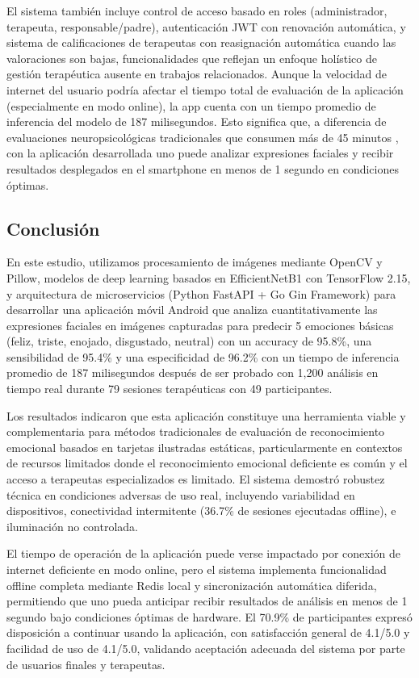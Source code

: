 \documentclass[journal,article,submit,pdftex,moreauthors]{Definitions/mdpi}
\begin{document}
	El sistema también incluye control de acceso basado en roles (administrador, terapeuta, responsable/padre), autenticación JWT con renovación automática, y sistema de calificaciones de terapeutas con reasignación automática cuando las valoraciones son bajas, funcionalidades que reflejan un enfoque holístico de gestión terapéutica ausente en trabajos relacionados. Aunque la velocidad de internet del usuario podría afectar el tiempo total de evaluación de la aplicación (especialmente en modo online), la app cuenta con un tiempo promedio de inferencia del modelo de 187 milisegundos. Esto significa que, a diferencia de evaluaciones neuropsicológicas tradicionales que consumen más de 45 minutos \cite{ref24,ref26}, con la aplicación desarrollada uno puede analizar expresiones faciales y recibir resultados desplegados en el smartphone en menos de 1 segundo en condiciones óptimas.
	
	\subsection{Conclusión}
	
	En este estudio, utilizamos procesamiento de imágenes mediante OpenCV y Pillow, modelos de deep learning basados en EfficientNetB1 con TensorFlow 2.15, y arquitectura de microservicios (Python FastAPI + Go Gin Framework) para desarrollar una aplicación móvil Android que analiza cuantitativamente las expresiones faciales en imágenes capturadas para predecir 5 emociones básicas (feliz, triste, enojado, disgustado, neutral) con un accuracy de 95.8\%, una sensibilidad de 95.4\% y una especificidad de 96.2\% con un tiempo de inferencia promedio de 187 milisegundos después de ser probado con 1,200 análisis en tiempo real durante 79 sesiones terapéuticas con 49 participantes.
	
	Los resultados indicaron que esta aplicación constituye una herramienta viable y complementaria para métodos tradicionales de evaluación de reconocimiento emocional basados en tarjetas ilustradas estáticas, particularmente en contextos de recursos limitados donde el reconocimiento emocional deficiente es común y el acceso a terapeutas especializados es limitado. El sistema demostró robustez técnica en condiciones adversas de uso real, incluyendo variabilidad en dispositivos, conectividad intermitente (36.7\% de sesiones ejecutadas offline), e iluminación no controlada.
	
	El tiempo de operación de la aplicación puede verse impactado por conexión de internet deficiente en modo online, pero el sistema implementa funcionalidad offline completa mediante Redis local y sincronización automática diferida, permitiendo que uno pueda anticipar recibir resultados de análisis en menos de 1 segundo bajo condiciones óptimas de hardware. El 70.9\% de participantes expresó disposición a continuar usando la aplicación, con satisfacción general de 4.1/5.0 y facilidad de uso de 4.1/5.0, validando aceptación adecuada del sistema por parte de usuarios finales y terapeutas.
	
\end{document}
